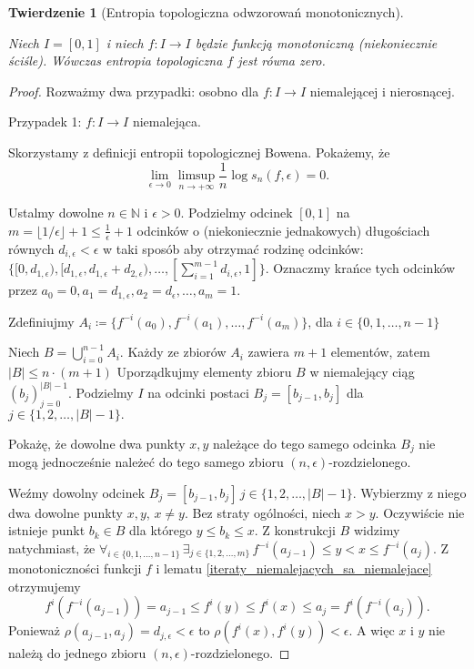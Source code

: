 \documentclass[licencjacka]{pwr_wmat_praca_dyplomowa}
\theoremstyle{plain}
\newtheorem{theorem}{Twierdzenie}
\numberwithin{theorem}{chapter}
\theoremstyle{definition}
\numberwithin{theorem}{chapter}
\begin{document}
 
\begin{theorem}[Entropia topologiczna odwzorowań monotonicznych]
\label{entropia_topologiczna_odwzorowan_monotonicznych}

Niech $I = [0, 1]$ i niech $f: I \rightarrow I$ będzie funkcją monotoniczną (niekoniecznie ściśle).
Wówczas entropia topologiczna $f$ jest równa zero.
\end{theorem}

\begin{proof}
Rozważmy dwa przypadki: osobno dla $f: I \rightarrow I$ niemalejącej i nierosnącej.
\item[Przypadek 1: $f: I \rightarrow I$ niemalejąca.]

Skorzystamy z definicji entropii topologicznej Bowena. Pokażemy, że 
$$\lim_{\epsilon \rightarrow 0} \limsup_{n \rightarrow +\infty} \frac{1}{n} \log s_n(f, \epsilon) = 0.$$


Ustalmy dowolne $n \in \mathbb{N}$ i $\epsilon > 0.$ Podzielmy odcinek $[0, 1]$ na $m = \lfloor 1/\epsilon \rfloor + 1 \leq \frac{1}{\epsilon} + 1$ odcinków o (niekoniecznie jednakowych) długościach równych $d_{i,\epsilon} < \epsilon$ w taki sposób aby otrzymać rodzinę odcinków: $\{ [0, d_{1,\epsilon}), [d_{1,\epsilon}, d_{1,\epsilon} + d_{2, \epsilon}), \ldots, [\sum_{i=1}^{m-1} d_{i, \epsilon}, 1] \}.$ Oznaczmy krańce tych odcinków przez $a_0=0, a_1 = d_{1,\epsilon}, a_2 = d_{\epsilon}, \ldots, a_m = 1.$ 

Zdefiniujmy $A_i \coloneqq \{f^{-i}(a_0), f^{-i}(a_1), \ldots, f^{-i}(a_m)\}$, dla $i \in \{0, 1, \ldots, n-1\}$

Niech $B = \bigcup_{i=0}^{n-1} A_i.$ Każdy ze zbiorów $A_i$ zawiera $m+1$ elementów, zatem $|B| \leq n \cdot (m+1)$ Uporządkujmy elementy zbioru $B$ w niemalejący ciąg $(b_j)_{j=0}^{|B|-1}.$ Podzielmy $I$ na odcinki postaci $B_j = [b_{j-1}, b_{j}]$ dla $j \in \{1, 2, \ldots, |B|-1\}.$  

Pokażę, że dowolne dwa punkty $x, y$ należące do tego samego odcinka $B_j$ nie mogą jednocześnie należeć do tego samego zbioru $(n, \epsilon)$-rozdzielonego.

Weźmy dowolny odcinek $B_j = [b_{j-1}, b_{j}] \, j \in \{1, 2, \ldots, |B|-1\}.$ Wybierzmy z niego dwa dowolne punkty $x, y$, $x \neq y$. Bez straty ogólności, niech $x > y.$ Oczywiście nie istnieje punkt $b_k \in B$ dla którego $y \leq b_k \leq x.$ Z konstrukcji $B$ widzimy natychmiast, że $\forall_{i \in \{0, 1, \ldots, n-1\}} \, \exists_{j \in \{1,2,\ldots,m\}} \, f^{-i}(a_{j-1}) \leq y < x \leq f^{-i}(a_j)$. Z monotoniczności funkcji $f$ i lematu \ref{iteraty_niemalejacych_sa_niemalejace} otrzymujemy 
$$f^i(f^{-i}(a_{j-1})) =  a_{j-1} \leq f^i(y) \leq f^i(x) \leq a_j = f^i(f^{-i}(a_j)).$$
Ponieważ $\rho(a_{j-1}, a_j) = d_{j,\epsilon} < \epsilon$ to  $\rho(f^i(x), f^i(y)) < \epsilon.$ A więc $x$ i $y$ nie należą do jednego zbioru $(n, \epsilon)$-rozdzielonego.




\end{proof}
\end{document}
